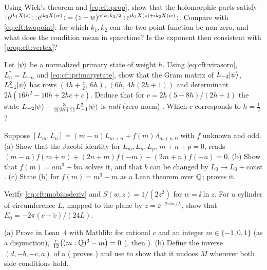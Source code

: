 \begin{exercise}[$\star\star$]\label{exr:cft:expexp}
Using Wick's theorem and \eqref{eq:cft:prop}, show that the holomorphic parts satisfy
$:\!\mathrm{e}^{\mathrm{i} k_1X(z)}\!:\,:\!\mathrm{e}^{\mathrm{i} k_2X(w)}\!:\;=(z-w)^{\alpha' k_1k_2/2}
:\!\mathrm{e}^{\mathrm{i} k_1X(z)+\mathrm{i} k_2X(w)}\!:$. Compare with \eqref{eq:cft:twopoint}: for which
$k_1,k_2$ can the two-point function be non-zero, and what does the condition mean in
spacetime? Is the exponent then consistent with \cref{prop:cft:vertex}?
\end{exercise}

\begin{exercise}[$\star\star$]\label{exr:cft:gram}
Let $|\psi\rangle$ be a normalized primary state of weight $h$. Using \eqref{eq:cft:virasoro},
$L_n^\dagger=L_{-n}$ and \eqref{eq:cft:primarystate}, show that the Gram matrix of
$L_{-2}|\psi\rangle$, $L_{-1}^2|\psi\rangle$ has rows $(4h+\frac c2,\ 6h)$, $(6h,\ 4h(2h+1))$ and
determinant $2h(16h^2-10h+2hc+c)$. Deduce that for $c=2h(5-8h)/(2h+1)$ the state
$L_{-2}|\psi\rangle-\frac{3}{2(2h+1)}L_{-1}^2|\psi\rangle$ is \emph{null} (zero norm)
. Which $c$ corresponds to $h=\frac12$?
\end{exercise}

\begin{exercise}[$\star\star$]\label{exr:cft:cocycle}
Suppose $[L_m,L_n]=(m-n)L_{m+n}+f(m)\,\delta_{m+n,0}$ with $f$ unknown and odd. (a) Show that
the Jacobi identity for $L_m,L_n,L_p$, $m+n+p=0$, reads
$(m-n)f(m+n)+(2n+m)f(-m)-(2m+n)f(-n)=0$. (b) Show that $f(m)=am^3+bm$ solves it, and that $b$
can be changed by $L_0\to L_0+\text{const}$. (c) State (b) for $f(m)=m^3-m$ as a Lean theorem
over $\mathbb{Q}$;  proves it.
\end{exercise}

\begin{exercise}[$\star\star$]\label{exr:cft:schwarz}
Verify \eqref{eq:cft:mobiusderiv} and $S(w,z)=1/(2z^2)$ for $w=\ii\ln z$. For a cylinder of
circumference $L$, mapped to the plane by $z=\ee^{-2\pi\ii w/L}$, show that
$E_0=-2\pi(c+\tilde c)/(24L)$.
\end{exercise}

\begin{exercise}\label{exr:cft:leancentral}
(a) Prove in Lean~4 with Mathlib: for rational $c$ and an integer $m\in\{-1,0,1\}$ (as a
disjunction), $\frac c{12}\big((m:\mathbb{Q})^3-m\big)=0$ (, then ). (b) Define
the inverse $(d,-b,-c,a)$ of a  (
proves ) and use  to show that it undoes $M$ wherever both
side conditions hold.
\end{exercise}

